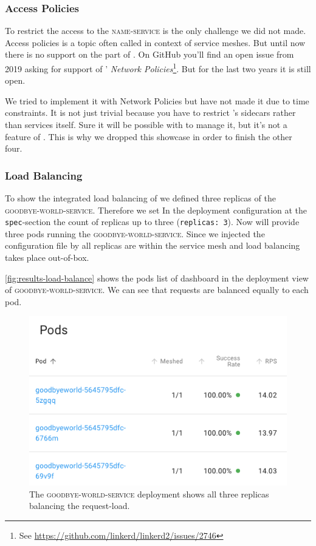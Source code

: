 \subsubsection{Access Policies}
To restrict the access to the \textsc{name-service} is the only challenge we did not made.
Access policies is a topic often called in context of service meshes.
But until now there is no support on the part of \linkerd{}.
On GitHub you'll find an open issue from 2019 asking for support of \kubernetes{}' \textit{Network Policies}\footnote{
	See \url{https://github.com/linkerd/linkerd2/issues/2746}	
}.
But for the last two years it is still open.
	
We tried to implement it with Network Policies but have not made it due to time constraints.
It is not just trivial because you have to restrict \linkerd{}'s sidecars rather than services itself.
Sure it will be possible with \kubernetes{} to manage it, but it's not a feature of \linkerd{}.
This is why we dropped this showcase in order to finish the other four.

\subsubsection{Load Balancing}
\label{sec:load-result}
To show the integrated load balancing of \linkerd{} we defined three replicas of the \textsc{goodbye-world-service}.
Therefore we set In the deployment configuration at the \lstinline|spec|-section the count of replicas up to three	 (\lstinline|replicas: 3|).
Now \kubernetes{} will provide three pods running the \textsc{goodbye-world-service}.
Since we injected the configuration file by \linkerd{} all replicas are within the service mesh and load balancing takes place out-of-box.

\autoref{fig:results-load-balance} shows the pods list of \linkerd{} dashboard in the deployment view of \textsc{goodbye-world-service}.
We can see that requests are balanced equally to each pod.

\begin{figure}
	\includegraphics[width=\columnwidth]{img/results-load-balance}
	\caption{The \textsc{goodbye-world-service} deployment shows all three replicas balancing the request-load.}
	\label{fig:results-load-balance}
\end{figure}

